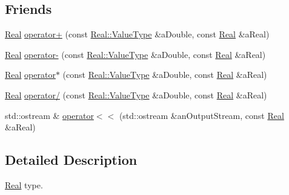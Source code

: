 \subsection*{Friends}
\begin{DoxyCompactItemize}
\item 
\mbox{\hyperlink{classlibrary_1_1core_1_1types_1_1_real}{Real}} \mbox{\hyperlink{classlibrary_1_1core_1_1types_1_1_real_a4e189d9163eb4d1edcc16035d78c69b6}{operator+}} (const \mbox{\hyperlink{classlibrary_1_1core_1_1types_1_1_real_a9c5c8826b7e5a8e39544d23fea6c0e1c}{Real\+::\+Value\+Type}} \&a\+Double, const \mbox{\hyperlink{classlibrary_1_1core_1_1types_1_1_real}{Real}} \&a\+Real)
\item 
\mbox{\hyperlink{classlibrary_1_1core_1_1types_1_1_real}{Real}} \mbox{\hyperlink{classlibrary_1_1core_1_1types_1_1_real_a6bc7663211551195d77a7136784c382a}{operator-\/}} (const \mbox{\hyperlink{classlibrary_1_1core_1_1types_1_1_real_a9c5c8826b7e5a8e39544d23fea6c0e1c}{Real\+::\+Value\+Type}} \&a\+Double, const \mbox{\hyperlink{classlibrary_1_1core_1_1types_1_1_real}{Real}} \&a\+Real)
\item 
\mbox{\hyperlink{classlibrary_1_1core_1_1types_1_1_real}{Real}} \mbox{\hyperlink{classlibrary_1_1core_1_1types_1_1_real_a7ca23417eb394573dad57b0e763b3e47}{operator$\ast$}} (const \mbox{\hyperlink{classlibrary_1_1core_1_1types_1_1_real_a9c5c8826b7e5a8e39544d23fea6c0e1c}{Real\+::\+Value\+Type}} \&a\+Double, const \mbox{\hyperlink{classlibrary_1_1core_1_1types_1_1_real}{Real}} \&a\+Real)
\item 
\mbox{\hyperlink{classlibrary_1_1core_1_1types_1_1_real}{Real}} \mbox{\hyperlink{classlibrary_1_1core_1_1types_1_1_real_a98345c81e7b374941fc15cbbd6922c5d}{operator/}} (const \mbox{\hyperlink{classlibrary_1_1core_1_1types_1_1_real_a9c5c8826b7e5a8e39544d23fea6c0e1c}{Real\+::\+Value\+Type}} \&a\+Double, const \mbox{\hyperlink{classlibrary_1_1core_1_1types_1_1_real}{Real}} \&a\+Real)
\item 
std\+::ostream \& \mbox{\hyperlink{classlibrary_1_1core_1_1types_1_1_real_a36816b0e006fd2ec3b0c53406439c7c3}{operator$<$$<$}} (std\+::ostream \&an\+Output\+Stream, const \mbox{\hyperlink{classlibrary_1_1core_1_1types_1_1_real}{Real}} \&a\+Real)
\end{DoxyCompactItemize}


\subsection{Detailed Description}
\mbox{\hyperlink{classlibrary_1_1core_1_1types_1_1_real}{Real}} type. 


